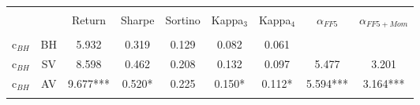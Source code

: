 

\begin{tabular}{@{\extracolsep{5pt}} Hcccccccc} 
\\
[-1.8ex]\hline 
\hline \\[-1.8ex] 
 &  & Return & Sharpe & Sortino & Kappa$_{3}$ & Kappa$_{4}$ & $\alpha_{FF5}$ & $\alpha_{FF5+Mom}$ \\ 
\hline \\[-1.8ex] 
c$_{BH}$ & BH & 5.932 & 0.319 & 0.129 & 0.082 & 0.061 &  &  \\ 
c$_{BH}$ & SV & 8.598 & 0.462 & 0.208 & 0.132 & 0.097 & 5.477 & 3.201 \\ 
c$_{BH}$ & AV & 9.677*** & 0.520* & 0.225 & 0.150* & 0.112* & 5.594*** & 3.164*** \\ 
\hline \\


\end{tabular} 

